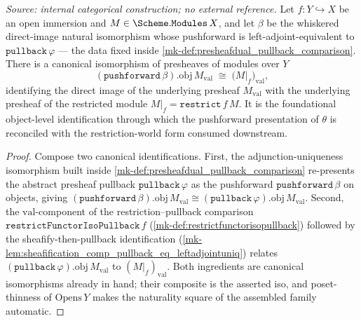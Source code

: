 \begin{definition}\label{mk-def:pushforward_obj_val_restrict_iso}
  \leanok

  \textit{Source: internal categorical construction; no external reference.}
  Let \(f : Y \hookrightarrow X\) be an open immersion and \(M \in \Scheme.\mathtt{Modules}\,X\), and let
  \(\beta\) be the whiskered direct-image natural isomorphism whose pushforward is
  left-adjoint-equivalent to \(\mathtt{pullback}\,\varphi\) --- the data fixed inside
  \ref{mk-def:presheafdual_pullback_comparison}. There is a canonical isomorphism of presheaves of modules
  over \(Y\)
  \[
    (\mathtt{pushforward}\,\beta).\mathrm{obj}\,M_{\mathrm{val}}
      \;\cong\; \bigl(M|_f\bigr)_{\mathrm{val}},
  \]
  identifying the direct image of the underlying presheaf \(M_{\mathrm{val}}\) with the underlying
  presheaf of the restricted module \(M|_f = \mathtt{restrict}\,f\,M\). It is the foundational
  object-level identification through which the pushforward presentation of \(\theta\) is reconciled with
  the restriction-world form consumed downstream.
\end{definition}
\begin{proof}
  \leanok
  Compose two canonical identifications. First, the adjunction-uniqueness isomorphism built inside
  \ref{mk-def:presheafdual_pullback_comparison} re-presents the abstract presheaf pullback
  \(\mathtt{pullback}\,\varphi\) as the pushforward \(\mathtt{pushforward}\,\beta\) on objects, giving
  \((\mathtt{pushforward}\,\beta).\mathrm{obj}\,M_{\mathrm{val}} \cong
  (\mathtt{pullback}\,\varphi).\mathrm{obj}\,M_{\mathrm{val}}\). Second, the \(\mathrm{val}\)-component of
  the restriction--pullback comparison \(\mathtt{restrictFunctorIsoPullback}\,f\)
  (\ref{mk-def:restrictfunctorisopullback}) followed by the sheafify-then-pullback identification
  (\ref{mk-lem:sheafification_comp_pullback_eq_leftadjointuniq}) relates
  \((\mathtt{pullback}\,\varphi).\mathrm{obj}\,M_{\mathrm{val}}\) to \((M|_f)_{\mathrm{val}}\). Both
  ingredients are canonical isomorphisms already in hand; their composite is the asserted iso, and
  poset-thinness of \(\mathrm{Opens}\,Y\) makes the naturality square of the assembled family automatic.
\end{proof}

